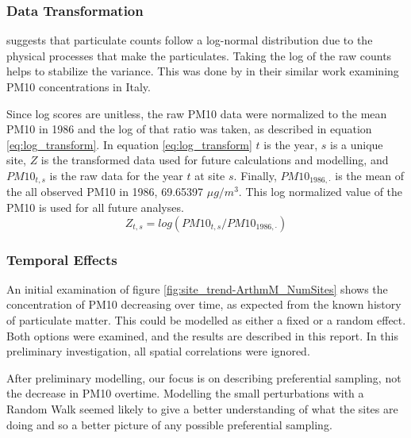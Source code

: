 \documentclass{article}
\begin{document}
\subsubsection*{Data Transformation}
\label{subsubsec:datatrans}
\cite{ott1990} suggests that particulate counts follow a log-normal distribution due to the physical processes that make the particulates.  Taking the log of the raw counts helps to stabilize the variance.  This was done by \cite{cameletti2011spatio}  in their similar work examining \ac{PM10} concentrations in Italy.

Since log scores are unitless, the raw \ac{PM10} data were normalized to the mean \ac{PM10} in 1986 and the log of that ratio was taken, as described in equation \ref{eq:log_transform}.  In equation \ref{eq:log_transform} $t$ is the year, $s$ is a unique site, $Z$ is the transformed data used for future calculations and modelling, and $PM10_{t,s}$ is the raw data for the year $t$ at site $s$.  Finally, $PM10_{1986,\cdot}$ is the mean of the all observed \ac{PM10} in 1986, 69.65397 $\mu g/m^3$.  This log normalized value of the \ac{PM10} is used for all future analyses.
\begin{equation}
    Z_{t,s} = log(PM10_{t,s}/ PM10_{1986,\cdot})
\end{equation} \label{eq:log_transform}


\subsubsection*{Temporal Effects}
\label{subsubsec:tempeffects}
An initial examination of figure \ref{fig:site_trend-ArthmM_NumSites} shows the concentration of \ac{PM10} decreasing over time, as expected from the known history of particulate matter.  This could be modelled as either a fixed or a random effect.  Both options were examined, and the results are described in this report.  In this preliminary investigation, all spatial correlations
were ignored.

After preliminary modelling, our focus is on describing preferential sampling, not the decrease in \ac{PM10} overtime. Modelling the small perturbations with a Random Walk seemed likely to give a better understanding of what the sites are doing and so a better picture of any possible preferential sampling.  
\end{document}
